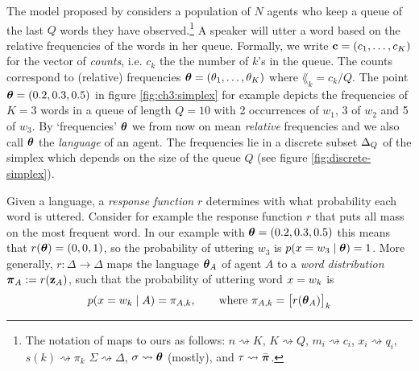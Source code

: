 \documentclass{../src/bcthesispart}
\begin{document}
The model proposed by \textcite{DeVylder2006} considers a population of $N$ agents who keep a queue of the last $Q$ words they have observed.\footnote{%
		The notation of \textcite{DeVylder2006} maps to ours as follows: 
			${n \rightsquigarrow K}$,
			${K \rightsquigarrow Q}$,
			${m_i \rightsquigarrow c_i}$,
			${x_i \rightsquigarrow q_i}$,
			${s(k) \rightsquigarrow \pi_k}$
			${\Sigma \rightsquigarrow \Delta}$,
			${\sigma \rightsquigarrow \boldsymbol{\mathbf{\theta}}}$ (mostly), and
			${\tau \rightsquigarrow \bar{\boldsymbol{\mathbf{\pi}}}}$.
	} 
A speaker will utter a word based on the relative frequencies of the words in her queue. 
Formally, we write $\boldsymbol{\mathbf{c}}=(c_1, \dots, c_K)$ for the vector of \emph{counts}, i.e. $c_k$ the the number of $k$’s in the queue.
The counts correspond to (relative) frequencies $\boldsymbol{\mathbf{\theta}} = (\theta_1, \dots, \theta_K)$ where $\lang_k = c_k / Q$.
The point $\boldsymbol{\mathbf{\theta}} = (0.2, 0.3, 0.5)$ in figure \ref{fig:ch3:simplex} for example depicts the frequencies of $K=3$ words in a queue of length $Q=10$ with 2 occurrences of $w_1$, 3 of $w_2$ and 5 of $w_3$.
By ‘frequencies’ $\boldsymbol{\mathbf{\theta}}$ we from now on mean \emph{relative} frequencies and we also call $\boldsymbol{\mathbf{\theta}}$ the \emph{language} of an agent.
The frequencies lie in a discrete subset $\Delta_Q$ of the simplex which depends on the size of the queue $Q$ (see figure \ref{fig:discrete-simplex}).




\begin{SCfigure}	
	
	
	\caption{
	All possible frequencies of 3 words in a queue of length 4 (left) and 6 (right) form a discrete subset of the simplex. 
	The corresponding relative frequencies are the ‘languages’ used by agents in the sampling-response model.
	Frequencies $(a,b,c)$ are labeled $abc$.
	\label{fig:discrete-simplex}}
\end{SCfigure}



Given a language, a \emph{response function} $r$ determines with what probability each word is uttered.
Consider for example the response function $r$ that puts all mass on the most frequent word.
In our example with $\boldsymbol{\mathbf{\theta}} = (0.2, 0.3, 0.5)$ this means that $r(\boldsymbol{\mathbf{\theta}}) = (0,0,1)$, so the probability of uttering $w_3$ is $p(x=w_3 \mid \boldsymbol{\mathbf{\theta}}) = 1$.
More generally, $r: \Delta \to \Delta$ maps the language $\boldsymbol{\mathbf{\theta}}_A$ of agent $A$ to a \emph{word distribution} $\boldsymbol{\mathbf{\pi}}_A := r(\boldsymbol{\mathbf{z}}_A)$, such that the probability of uttering word $x=w_k$ is
\begin{align}
	p(x = w_k \mid A) 
		= \pi_{A,k}, 
	\qquad \text{where $\pi_{A,k} = \bigl[r(\boldsymbol{\mathbf{\theta}}_A)\bigr]_k$}
\end{align}
\end{document}
